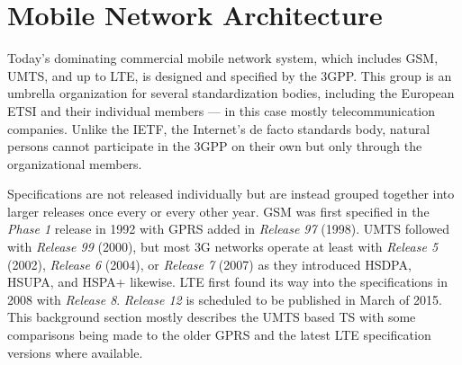 \section{Mobile Network Architecture}
\label{c4:sec:3gpparchitecture}

Today's dominating commercial mobile network system, which includes \gls{GSM}, \gls{UMTS}, and up to \gls{LTE}, is designed and specified by the \gls{3GPP}. This group is an umbrella organization for several standardization bodies, including the European \gls{ETSI} and their individual members --- in this case mostly telecommunication companies. Unlike the \gls{IETF}, the Internet's de facto standards body, natural persons cannot participate in the \gls{3GPP} on their own but only through the organizational members.

Specifications are not released individually but are instead grouped together into larger releases once every or every other year. \gls{GSM} was first specified in the \textit{Phase 1} release in 1992 with \gls{GPRS} added in \textit{Release 97} (1998). \gls{UMTS} followed with \textit{Release 99} (2000), but most \gls{3G} networks operate at least with \textit{Release 5} (2002), \textit{Release 6} (2004), or \textit{Release 7} (2007) as they introduced \gls{HSDPA}, \gls{HSUPA}, and \gls{HSPA+} likewise. \gls{LTE} first found its way into the specifications in 2008 with \textit{Release 8}. \textit{Release 12} is scheduled to be published in March of 2015. This background section mostly describes the \gls{UMTS} based \gls{TS} with some comparisons being made to the older \gls{GPRS} and the latest \gls{LTE} specification versions where available.

